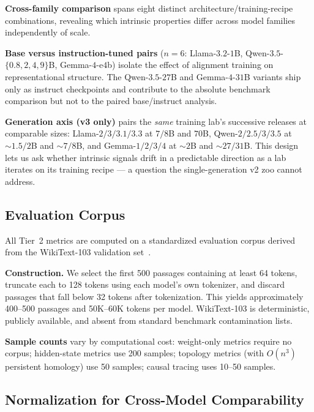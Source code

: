 \documentclass[preprint]{neurips_2025}
\begin{document}
\textbf{Cross-family comparison} spans eight distinct architecture/training-recipe combinations, revealing which intrinsic properties differ across model families independently of scale.

\textbf{Base versus instruction-tuned pairs} ($n = 6$: Llama-$3.2$-$1$B, Qwen-$3.5$-$\{0.8, 2, 4, 9\}$B, Gemma-$4$-e$4$b) isolate the effect of alignment training on representational structure. The Qwen-$3.5$-$27$B and Gemma-$4$-$31$B variants ship only as instruct checkpoints and contribute to the absolute benchmark comparison but not to the paired base/instruct analysis.

\textbf{Generation axis (v3 only)} pairs the \emph{same} training lab's successive releases at comparable sizes: Llama-$2/3/3.1/3.3$ at $7/8$B and $70$B, Qwen-$2/2.5/3/3.5$ at $\sim 1.5/2$B and $\sim 7/8$B, and Gemma-$1/2/3/4$ at $\sim 2$B and $\sim 27/31$B. This design lets us ask whether intrinsic signals drift in a predictable direction as a lab iterates on its training recipe --- a question the single-generation v2 zoo cannot address.

\subsection{Evaluation Corpus}
\label{sec:corpus}

All Tier~2 metrics are computed on a standardized evaluation corpus derived from the WikiText-103 validation set~\citep{merity2017pointer}.

\textbf{Construction.}
We select the first 500 passages containing at least 64 tokens, truncate each to 128 tokens using each model's own tokenizer, and discard passages that fall below 32 tokens after tokenization.
This yields approximately 400--500 passages and 50K--60K tokens per model.
WikiText-103 is deterministic, publicly available, and absent from standard benchmark contamination lists.

\textbf{Sample counts} vary by computational cost: weight-only metrics require no corpus; hidden-state metrics use 200 samples; topology metrics (with $O(n^3)$ persistent homology) use 50 samples; causal tracing uses 10--50 samples.

\subsection{Normalization for Cross-Model Comparability}
\label{sec:normalization}
\end{document}
